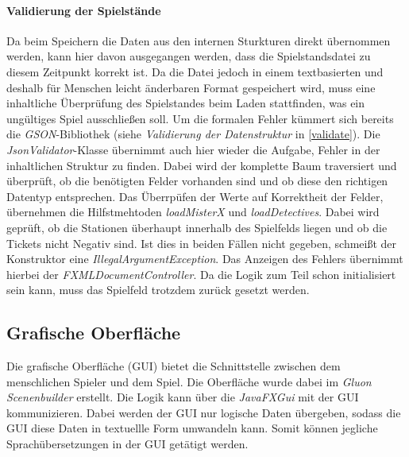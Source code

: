             \paragraph{Validierung der Spielstände}
                Da beim Speichern die Daten aus den internen Sturkturen direkt übernommen werden, kann hier davon ausgegangen werden,
                dass die Spielstandsdatei zu diesem Zeitpunkt korrekt ist.
                Da die Datei jedoch in einem textbasierten und deshalb für Menschen leicht änderbaren Format gespeichert wird,
                muss eine inhaltliche Überprüfung des Spielstandes beim Laden stattfinden, was ein ungültiges Spiel ausschließen soll.
                \newline
                Um die formalen Fehler kümmert sich bereits die \textit{GSON}-Bibliothek (siehe \textit{Validierung der Datenstruktur} in \ref{validate}).
                Die \textit{JsonValidator}-Klasse übernimmt auch hier wieder die Aufgabe, Fehler in der inhaltlichen Struktur zu finden.
                Dabei wird der komplette Baum traversiert und überprüft, ob die benötigten Felder vorhanden sind und ob diese den richtigen Datentyp entsprechen.
                Das Überrpüfen der Werte auf Korrektheit der Felder, übernehmen die Hilfstmehtoden \textit{loadMisterX} und \textit{loadDetectives}.
                Dabei wird geprüft, ob die Stationen überhaupt innerhalb des Spielfelds liegen und ob die Tickets nicht Negativ sind.
                Ist dies in beiden Fällen nicht gegeben, schmeißt der Konstruktor eine \textit{IllegalArgumentException}.
                Das Anzeigen des Fehlers übernimmt hierbei der \textit{FXMLDocumentController}.
                Da die Logik zum Teil schon initialisiert sein kann, muss das Spielfeld trotzdem zurück gesetzt werden.

        \subsection{Grafische Oberfläche}
            Die grafische Oberfläche (GUI) bietet die Schnittstelle zwischen dem menschlichen Spieler und dem Spiel.
            Die Oberfläche wurde dabei im \textit{Gluon Scenenbuilder} erstellt.
            Die Logik kann über die \textit{JavaFXGui} mit der GUI kommunizieren.
            Dabei werden der GUI nur logische Daten übergeben, sodass die GUI diese Daten in textuellle Form umwandeln kann.
            Somit können jegliche Sprachübersetzungen in der GUI getätigt werden.
            
